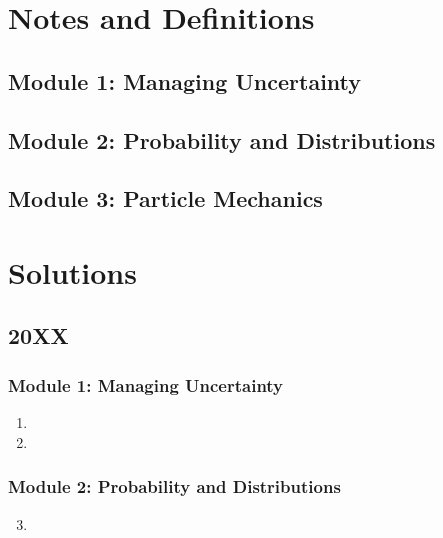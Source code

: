 \documentclass[fleqn,titlepage]{book}
\numberwithin{equation}{section}
\theoremstyle{plain}
\theoremstyle{definition}
\theoremstyle{remark}
\begin{document}
\part{Notes and Definitions}
\chapter{Module 1: Managing Uncertainty}

\chapter{Module 2: Probability and Distributions}

\chapter{Module 3: Particle Mechanics}


\part{Solutions}


\chapter{20XX}
\section{Module 1: Managing Uncertainty}
\begin{enumerate}[label=\bfseries  \arabic*.]\setcounter{enumi}{0}
\item 
\item 
\end{enumerate}
\section{Module 2: Probability and Distributions}
\begin{enumerate}[label=\bfseries  \arabic*.]\setcounter{enumi}{2}
\item 
\end{enumerate}
\end{document}
